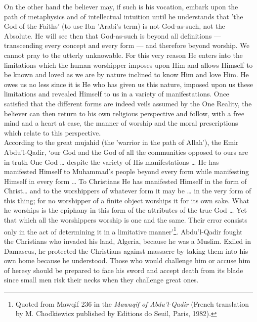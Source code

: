 \documentclass[10pt, twoside]{book}
\begin{document}
On the other hand the believer may, if such is his vocation, embark upon the path of metaphysics and 
of intellectual intuition until he understands that 'the God of the Faiths' (to use Ibn 'Arabi's 
term) is not God\hyp{}as\hyp{}such, not the Absolute. He will see then that God\hyp{}as\hyp{}such is beyond all 
definitions --- transcending every concept and every form --- and therefore beyond worship. We cannot 
pray to the utterly unknowable. For this very reason He enters into the limitations which the human 
worshipper imposes upon Him and allows Himself to be known and loved as we are by nature inclined to 
know Him and love Him. He owes us no less since it is He who has given us this nature, imposed upon 
us these limitations and revealed Himself to us in a variety of manifestations. Once satisfied that 
the different forms are indeed veils assumed by the One Reality, the believer can then return to his 
own religious perspective and follow, with a free mind and a heart at ease, the manner of worship and 
the moral prescriptions which relate to this perspective. \\

According to the great mujahid (the 'warrior in the path of Allah'), the Emir Abdu'l\hyp{}Qadir, `our God 
and the God of all the communities opposed to ours are in truth One God \ldots{} despite the variety of 
His manifestations \ldots{} He has manifested Himself to Muhammad's people beyond every form while 
manifesting Himself in every form \ldots{} To Christians He has manifested Himself in the form of 
Christ\ldots{} and to the worshippers of whatever form it may be \ldots{} in the very form of this thing; for no worshipper of a finite object worships it for its own sake. What he worships is the epiphany in 
this form of the attributes of the true God \ldots{} Yet that which all the worshippers worship is one and 
the same. Their error consists only in the act of determining it in a limitative manner'\footnote{Quoted from Mawqif 236 in the \emph{Mawaqif of Abdu'l\hyp{}Qadir} (French translation by M. Chodkiewicz 
published by Editions do Seuil, Paris, 1982).}. Abdu'l\hyp{}Qadir fought the Christians who invaded his land, Algeria, because he was a Muslim. Exiled in Damascus, he protected the Christians against massacre by taking them into his own home because he understood. Those who would challenge him or accuse him of heresy should be prepared to face his sword and accept death from its blade since small men risk their necks when they challenge great ones. \\
\end{document}
